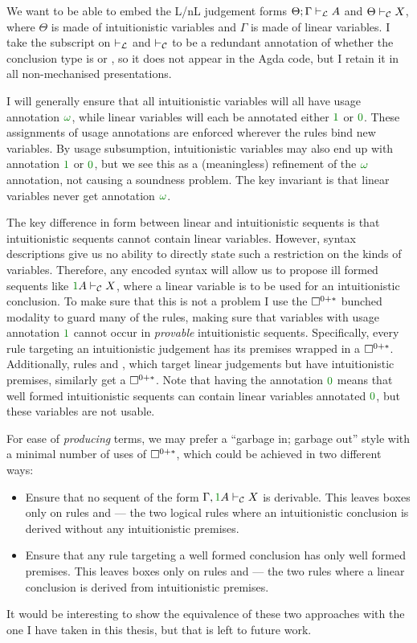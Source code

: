 We want to be able to embed the L/nL judgement forms
$\Theta; \Gamma \mathrel{\vdash_{\mathcal L}} A$ and $\Theta \mathrel{\vdash_{\mathcal C}} X$, where
$\Theta$ is made of intuitionistic variables and $\Gamma$ is made of linear
variables.
I take the subscript on $\mathrel{\vdash_{\mathcal L}}$ and $\mathrel{\vdash_{\mathcal C}}$ to be a redundant annotation of
whether the conclusion type is  or
, so it does not appear in the Agda code, but I
retain it in all non-mechanised presentations.

I will generally ensure that all intuitionistic variables will all have usage
annotation $\gr\omega$, while linear variables will each be annotated
either $\gr1$ or $\gr0$.
These assignments of usage annotations are enforced wherever the rules bind new
variables.
By usage subsumption, intuitionistic variables may also end up with annotation
$\gr1$ or $\gr0$, but we see this as a (meaningless) refinement of the
$\gr\omega$ annotation, not causing a soundness problem.
The key invariant is that linear variables never get annotation $\gr\omega$.

The key difference in form between linear and intuitionistic sequents is that
intuitionistic sequents cannot contain linear variables.
However, syntax descriptions give us no ability to directly state such a
restriction on the kinds of variables.
Therefore, any encoded syntax will allow us to propose ill formed sequents like
$\gr1A \vdashC X$, where a linear variable is to be used for an intuitionistic
conclusion.
To make sure that this is not a problem I use the $\Box^{0{+}{*}}$ bunched modality to
guard many of the rules, making sure that variables with usage annotation $\gr1$
cannot occur in \emph{provable} intuitionistic sequents.
Specifically, every rule targeting an intuitionistic judgement has its premises
wrapped in a $\Box^{0{+}{*}}$.
Additionally, rules  and , which target linear
judgements but have intuitionistic premises, similarly get a $\Box^{0{+}{*}}$.
Note that having the annotation $\gr0$ means that well formed intuitionistic
sequents can contain linear variables annotated $\gr0$, but these variables are
not usable.

For ease of \emph{producing} terms, we may prefer a ``garbage in; garbage out''
style with a minimal number of uses of $\Box^{0{+}{*}}$, which could be achieved in two
different ways:
\begin{itemize}
  \item
    Ensure that no sequent of the form $\Gamma, \gr1A \vdashC X$ is derivable.
    This leaves boxes only on rules  and  --- the
    two logical rules where an intuitionistic conclusion is derived without any
    intuitionistic premises.
  \item
    Ensure that any rule targeting a well formed conclusion has only well formed
    premises.
    This leaves boxes only on rules  and  --- the
    two rules where a linear conclusion is derived from intuitionistic premises.
\end{itemize}
It would be interesting to show the equivalence of these two approaches with the
one I have taken in this thesis, but that is left to future work.

